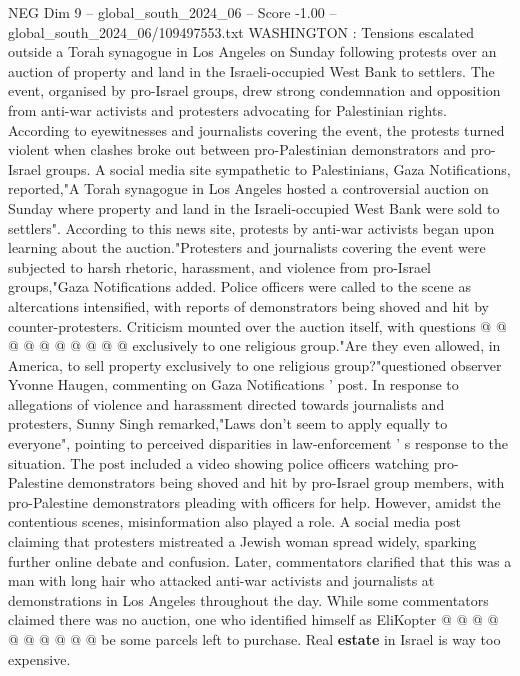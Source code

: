 \begin{textsample}{NEG Dim 9 – global\_south\_2024\_06 – Score -1.00 – global\_south\_2024\_06/109497553.txt}  \label{ex:f9_neg_400}
WASHINGTON : Tensions escalated outside a Torah synagogue in Los Angeles on Sunday following protests over an auction of property and land in the Israeli-occupied West Bank to settlers.
The event, organised by pro-Israel groups, drew strong condemnation and opposition from anti-war activists and protesters advocating for Palestinian rights.
According to eyewitnesses and journalists covering the event, the protests turned violent when clashes broke out between pro-Palestinian demonstrators and pro-Israel groups.
A social media site sympathetic to Palestinians, Gaza Notifications, reported,"A Torah synagogue in Los Angeles hosted a controversial auction on Sunday where property and land in the Israeli-occupied West Bank were sold to settlers".
According to this news site, protests by anti-war activists began upon learning about the auction."Protesters and journalists covering the event were subjected to harsh rhetoric, harassment, and violence from pro-Israel groups,"Gaza Notifications added.
Police officers were called to the scene as altercations intensified, with reports of demonstrators being shoved and hit by counter-protesters.
Criticism mounted over the auction itself, with questions @ @ @ @ @ @ @ @ @ @ exclusively to one religious group."Are they even allowed, in America, to sell property exclusively to one religious group?"questioned observer Yvonne Haugen, commenting on Gaza Notifications ' post.
In response to allegations of violence and harassment directed towards journalists and protesters, Sunny Singh remarked,"Laws don't seem to apply equally to everyone", pointing to perceived disparities in law-enforcement ' s response to the situation.
The post included a video showing police officers watching pro-Palestine demonstrators being shoved and hit by pro-Israel group members, with pro-Palestine demonstrators pleading with officers for help.
However, amidst the contentious scenes, misinformation also played a role.
A social media post claiming that protesters mistreated a Jewish woman spread widely, sparking further online debate and confusion.
Later, commentators clarified that this was a man with long hair who attacked anti-war activists and journalists at demonstrations in Los Angeles throughout the day.
While some commentators claimed there was no auction, one who identified himself as EliKopter @ @ @ @ @ @ @ @ @ @ be some parcels left to purchase.
Real \textbf{estate} in Israel is way too expensive.

\end{textsample}
